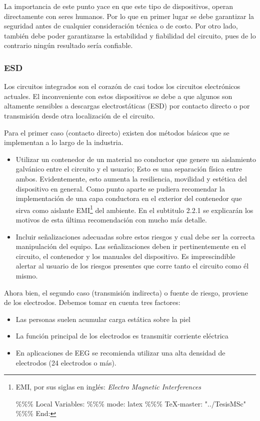 La importancia de este punto yace en que este tipo de dispositivos, operan directamente con seres humanos. Por lo que en primer lugar se debe garantizar la seguridad antes de cualquier consideración técnica o de costo. Por otro lado, también debe poder garantizarse la estabilidad y fiabilidad del circuito, pues de lo contrario ningún resultado sería confiable.

\subsubsection{ESD}
\label{sec:org397a5d5}
Los circuitos integrados son el corazón de casi todos los circuitos electrónicos actuales. El inconveniente con estos dispositivos se debe a que algunos son altamente sensibles a descargas electrostáticas (ESD) por contacto directo o por transmisión desde otra localización de el circuito.

Para el primer caso (contacto directo) existen dos métodos básicos que se implementan a lo largo de la industria.

\begin{itemize}
\item Utilizar un contenedor de un material no conductor que genere un aislamiento galvánico entre el circuito y el usuario; Esto es una separación física entre ambos. Evidentemente, esto aumenta la resiliencia, movilidad y estética del dispositivo en general. Como punto aparte se pudiera recomendar la implementación de una capa conductora en el exterior del contenedor que sirva como aislante EMI\footnote{EMI, por sus siglas en inglés: \emph{Electro Magnetic Interferences}

\%\%\% Local Variables:
\%\%\% mode: latex
\%\%\% \TeX{}-master: "../TesisMSc"
\%\%\% End:} del ambiente. En el subtitulo 2.2.1 se explicarán los motivos de esta última recomendación con mucho más detalle.

\item Incluir señalizaciones adecuadas sobre estos riesgos y cual debe ser la correcta manipulación del equipo. Las señalizaciones deben ir pertinentemente en el circuito, el contenedor y los manuales del dispositivo. Es imprescindible alertar al usuario de los riesgos presentes que corre tanto el circuito como él mismo.
\end{itemize}

Ahora bien, el segundo caso (transmisión indirecta) o fuente de riesgo, proviene de los electrodos. Debemos tomar en cuenta tres factores:
\begin{itemize}
\item Las personas suelen acumular carga estática sobre la piel
\item La función principal de los electrodos es transmitir corriente eléctrica
\item En aplicaciones de EEG se recomienda utilizar una alta densidad de electrodos (24 electrodos o más).
\end{itemize}


